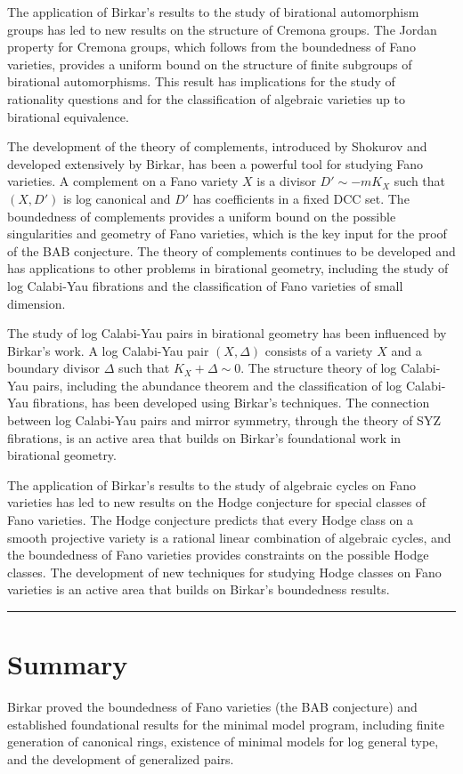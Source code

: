 The application of Birkar's results to the study of birational automorphism groups has led to new results on the structure of Cremona groups. The Jordan property for Cremona groups, which follows from the boundedness of Fano varieties, provides a uniform bound on the structure of finite subgroups of birational automorphisms. This result has implications for the study of rationality questions and for the classification of algebraic varieties up to birational equivalence.

The development of the theory of complements, introduced by Shokurov and developed extensively by Birkar, has been a powerful tool for studying Fano varieties. A complement on a Fano variety $X$ is a divisor $D' \sim -mK_X$ such that $(X, D')$ is log canonical and $D'$ has coefficients in a fixed DCC set. The boundedness of complements provides a uniform bound on the possible singularities and geometry of Fano varieties, which is the key input for the proof of the BAB conjecture. The theory of complements continues to be developed and has applications to other problems in birational geometry, including the study of log Calabi-Yau fibrations and the classification of Fano varieties of small dimension.

The study of log Calabi-Yau pairs in birational geometry has been influenced by Birkar's work. A log Calabi-Yau pair $(X, \Delta)$ consists of a variety $X$ and a boundary divisor $\Delta$ such that $K_X + \Delta \sim 0$. The structure theory of log Calabi-Yau pairs, including the abundance theorem and the classification of log Calabi-Yau fibrations, has been developed using Birkar's techniques. The connection between log Calabi-Yau pairs and mirror symmetry, through the theory of SYZ fibrations, is an active area that builds on Birkar's foundational work in birational geometry.

The application of Birkar's results to the study of algebraic cycles on Fano varieties has led to new results on the Hodge conjecture for special classes of Fano varieties. The Hodge conjecture predicts that every Hodge class on a smooth projective variety is a rational linear combination of algebraic cycles, and the boundedness of Fano varieties provides constraints on the possible Hodge classes. The development of new techniques for studying Hodge classes on Fano varieties is an active area that builds on Birkar's boundedness results.

\begin{center}\rule{0.5\linewidth}{0.5pt}\end{center}

\section*{Summary}

Birkar proved the boundedness of Fano varieties (the BAB conjecture) and established foundational results for the minimal model program, including finite generation of canonical rings, existence of minimal models for log general type, and the development of generalized pairs.
